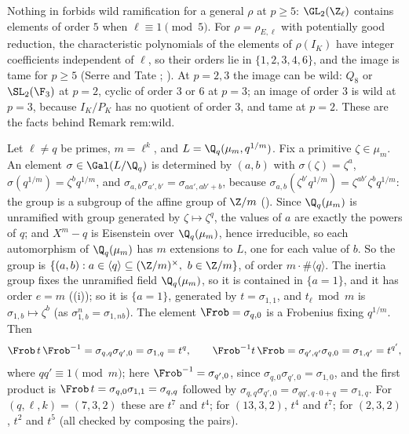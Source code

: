 \begin{remark}\label{rem:local:wild-ec}
Nothing in  forbids wild ramification for a general $\rho$ at $p\ge5$: $\GL_2(\Z_\ell)$ contains elements of order $5$ when
$\ell\equiv1\pmod5$. For $\rho=\rho_{E,\ell}$ with potentially good reduction, the characteristic polynomials of the elements of $\rho(I_K)$ have integer
coefficients independent of $\ell$, so their orders lie in $\{1,2,3,4,6\}$, and the image is tame for $p\ge5$ (Serre and Tate \cite[Section 2]{SerreTate68};
). At $p=2,3$ the image can be wild: $Q_8$ or $\SL_2(\F_3)$ at $p=2$, cyclic of order $3$ or $6$ at $p=3$; an image of order $3$
is wild at $p=3$, because $I_K/P_K$ has no quotient of order $3$, and tame at $p=2$. These are the facts behind Remark rem:wild.
\end{remark}

\begin{example}\label{ex:local:tame-explicit}
Let $\ell\ne q$ be primes, $m=\ell^k$, and $L=\Q_q(\mu_m,q^{1/m})$. Fix a primitive $\zeta\in\mu_m$. An element $\sigma\in\Gal(L/\Q_q)$ is determined by $(a,b)$ with
$\sigma(\zeta)=\zeta^a$, $\sigma(q^{1/m})=\zeta^bq^{1/m}$, and $\sigma_{a,b}\sigma_{a',b'}=\sigma_{aa',ab'+b}$, because
$\sigma_{a,b}(\zeta^{b'}q^{1/m})=\zeta^{ab'}\zeta^bq^{1/m}$: the group is a subgroup of the affine group of $\Z/m$
(). Since $\Q_q(\mu_m)$ is unramified with group generated by $\zeta\mapsto\zeta^q$, the values of $a$ are exactly the powers of $q$; and
$X^m-q$ is Eisenstein over $\Q_q(\mu_m)$, hence irreducible, so each automorphism of $\Q_q(\mu_m)$ has $m$ extensions to $L$, one for each value of $b$. So the group is
$\{(a,b):a\in\langle q\rangle\subseteq(\Z/m)^\times,\ b\in\Z/m\}$, of order $m\cdot\#\langle q\rangle$. The inertia group fixes the unramified field
$\Q_q(\mu_m)$, so it is contained in $\{a=1\}$, and it has order $e=m$ ((i)); so it is $\{a=1\}$, generated by $t=\sigma_{1,1}$, and
$t_\ell\bmod m$ is $\sigma_{1,b}\mapsto\zeta^b$ (as $\sigma_{1,b}^n=\sigma_{1,nb}$). The element $\Frob=\sigma_{q,0}$ is a Frobenius fixing $q^{1/m}$. Then
\[
\Frob\,t\,\Frob^{-1}=\sigma_{q,q}\sigma_{q',0}=\sigma_{1,q}=t^q,\qquad\Frob^{-1}t\,\Frob=\sigma_{q',q'}\sigma_{q,0}=\sigma_{1,q'}=t^{q'},
\]
where $qq'\equiv1\pmod m$; here $\Frob^{-1}=\sigma_{q',0}$, since $\sigma_{q,0}\sigma_{q',0}=\sigma_{1,0}$, and the first product is
$\Frob\,t=\sigma_{q,0}\sigma_{1,1}=\sigma_{q,q}$ followed by $\sigma_{q,q}\sigma_{q',0}=\sigma_{qq',q\cdot0+q}=\sigma_{1,q}$.
For $(q,\ell,k)=(7,3,2)$ these are $t^7$ and $t^4$; for $(13,3,2)$, $t^4$ and $t^7$; for $(2,3,2)$, $t^2$ and $t^5$ (all checked by composing the pairs).
\end{example}

